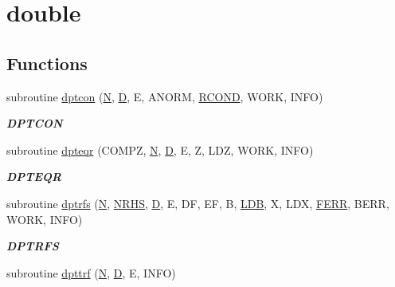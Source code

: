 \hypertarget{group__doublePTcomputational}{}\section{double}
\label{group__doublePTcomputational}
\subsection*{Functions}
\begin{DoxyCompactItemize}
\item 
subroutine \hyperlink{group__doublePTcomputational_ga97c36939111e6f008b6d9bd731854355}{dptcon} (\hyperlink{polmisc_8c_a0240ac851181b84ac374872dc5434ee4}{N}, \hyperlink{odrpack_8h_a7dae6ea403d00f3687f24a874e67d139}{D}, E, A\+N\+O\+R\+M, \hyperlink{superlu__enum__consts_8h_af00a42ecad444bbda75cde1b64bd7e72a9b5c151728d8512307565994c89919d5}{R\+C\+O\+N\+D}, W\+O\+R\+K, I\+N\+F\+O)
\begin{DoxyCompactList}\small\item\em {\bfseries D\+P\+T\+C\+O\+N} \end{DoxyCompactList}\item 
subroutine \hyperlink{group__doublePTcomputational_ga03d834df95ce593c02831f77602cfa7d}{dpteqr} (C\+O\+M\+P\+Z, \hyperlink{polmisc_8c_a0240ac851181b84ac374872dc5434ee4}{N}, \hyperlink{odrpack_8h_a7dae6ea403d00f3687f24a874e67d139}{D}, E, Z, L\+D\+Z, W\+O\+R\+K, I\+N\+F\+O)
\begin{DoxyCompactList}\small\item\em {\bfseries D\+P\+T\+E\+Q\+R} \end{DoxyCompactList}\item 
subroutine \hyperlink{group__doublePTcomputational_ga04d5010035410aca1d81e9ee1587fd17}{dptrfs} (\hyperlink{polmisc_8c_a0240ac851181b84ac374872dc5434ee4}{N}, \hyperlink{example__user_8c_aa0138da002ce2a90360df2f521eb3198}{N\+R\+H\+S}, \hyperlink{odrpack_8h_a7dae6ea403d00f3687f24a874e67d139}{D}, E, D\+F, E\+F, B, \hyperlink{example__user_8c_a50e90a7104df172b5a89a06c47fcca04}{L\+D\+B}, X, L\+D\+X, \hyperlink{superlu__enum__consts_8h_af00a42ecad444bbda75cde1b64bd7e72a78fd14d7abebae04095cfbe02928f153}{F\+E\+R\+R}, B\+E\+R\+R, W\+O\+R\+K, I\+N\+F\+O)
\begin{DoxyCompactList}\small\item\em {\bfseries D\+P\+T\+R\+F\+S} \end{DoxyCompactList}\item 
subroutine \hyperlink{group__doublePTcomputational_gad408508a4fb3810c23125995dc83ccc1}{dpttrf} (\hyperlink{polmisc_8c_a0240ac851181b84ac374872dc5434ee4}{N}, \hyperlink{odrpack_8h_a7dae6ea403d00f3687f24a874e67d139}{D}, E, I\+N\+F\+O)

\end{DoxyCompactItemize}
